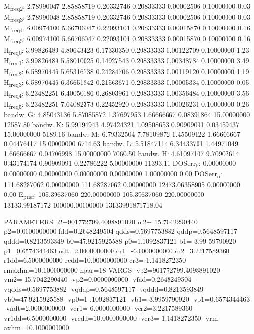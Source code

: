 \documentclass[11pt]{article}
\begin{document}
M\textsubscript{freq}\textsubscript{2}:   2.78990047   2.85858719   0.20332746   0.20833333   0.00002506   0.10000000         0.03
M\textsubscript{freq}\textsubscript{3}:   2.78990048   2.85858719   0.20332746   0.20833333   0.00002506   0.10000000         0.03
M\textsubscript{freq}\textsubscript{4}:   6.00974100   5.66706047   0.22093101   0.20833333   0.00015870   0.10000000         0.16
M\textsubscript{freq}\textsubscript{5}:   6.00974100   5.66706047   0.22093101   0.20833333   0.00015870   0.10000000         0.16
H\textsubscript{freq}\textsubscript{0}:   3.99826489   4.80643423   0.17330350   0.20833333   0.00122709   0.10000000         1.23
H\textsubscript{freq}\textsubscript{1}:   3.99826489   5.58010025   0.14927543   0.20833333   0.00348784   0.10000000         3.49
H\textsubscript{freq}\textsubscript{2}:   6.58970446   5.65316738   0.24284706   0.20833333   0.00119120   0.10000000         1.19
H\textsubscript{freq}\textsubscript{3}:   6.58970446   6.36651842   0.21563671   0.20833333   0.00005334   0.10000000         0.05
H\textsubscript{freq}\textsubscript{4}:   8.23482251   6.40050186   0.26803961   0.20833333   0.00356484   0.10000000         3.56
H\textsubscript{freq}\textsubscript{5}:   8.23482251   7.64082373   0.22452920   0.20833333   0.00026231   0.10000000         0.26
bandw. G:   4.85043136   5.87085872   1.37697953   1.66666667   0.08391864  15.00000000     12587.80
bandw. K:   5.99194943   4.97424321   1.09508653   0.90909091   0.03459437  15.00000000      5189.16
bandw. M:   6.79332504   7.78109872   1.45509122   1.66666667   0.04476417  15.00000000      6714.63
bandw. L:   5.51847114   6.34433701   1.44971049   1.66666667   0.04706998  15.00000000      7060.50
bandw. H:   4.61097107   9.70902614   0.43174174   0.90909091   0.22786222   5.00000000     11393.11
DOSerr\textsubscript{h}:   0.00000000   0.00000000   0.00000000   0.00000000   0.00000000   1.00000000         0.00
DOSerr\textsubscript{o}: 111.68287062   0.00000000 111.68287062   0.00000000 12473.06358905   0.00000000         0.00
E\textsubscript{pris}\textsubscript{f}: 105.39637060 220.00000000 105.39637060 220.00000000 13133.99187172 100000.00000000 13133991871718.04


PARAMETERS
  b2=901772799.4098891020 m2=-15.7042290440 p2=0.0000000000 fdd=0.2648249504 qdds=0.5697753882 qddp=0.5648597117 qddd=0.8213593849 b0=47.9215925588 p0=1.1092837121 b1=-3.99
59790920 p1=0.6574344463 ndt=2.0000000000 cr1=-6.0000000000 cr2=3.2217589360 r1dd=6.5000000000 rcdd=10.0000000000 cr3=-1.1418272350 rmaxhm=10.1000000000 npar=18 
VARGS
    -vb2=901772799.4098891020 -vm2=-15.7042290440 -vp2=0.0000000000 -vfdd=0.2648249504 -vqdds=0.5697753882 -vqddp=0.5648597117 -vqddd=0.8213593849 -vb0=47.9215925588 -vp0=1
.1092837121 -vb1=-3.9959790920 -vp1=0.6574344463 -vndt=2.0000000000 -vcr1=-6.0000000000 -vcr2=3.2217589360 -vr1dd=6.5000000000 -vrcdd=10.0000000000 -vcr3=-1.1418272350 -vrm
axhm=10.1000000000 
\end{document}
